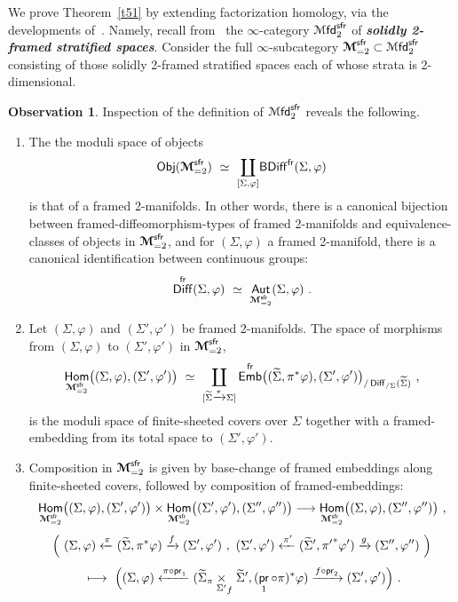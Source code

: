 \documentclass{amsart}
\theoremstyle{definition}
\newtheorem{observation}[theorem]{Observation}
\theoremstyle{remark}
\DeclareMathOperator{\pr}{\mathsf{pr}}
\DeclareMathOperator{\Aut}{\sf Aut}
\DeclareMathOperator{\Hom}{\sf Hom}
\newcommand{\bit}[1]{\textbf{\textit{#1}}}
\DeclareMathOperator{\Diff}{{\sf Diff}}
\DeclareMathOperator{\Mfd}{{\cM}\mathsf{fd}}
\DeclareMathOperator{\Emb}{\mathsf{Emb}}
\DeclareMathOperator{\fr}{\sf fr}
\DeclareMathOperator{\sfr}{\sf sfr}
\newcommand{\w}{\widetilde}
\newcommand{\xra}{\xrightarrow}
\newcommand{\xla}{\xleftarrow}
\def\cM{\mathcal M}\def\cN{\mathcal N}\def\cO{\mathcal O}\def\cP{\mathcal P}
\def\bcM{\boldsymbol{\mathcal M}}\def\bcN{\boldsymbol{\mathcal N}}\def\bcO{\boldsymbol{\mathcal O}}\def\bcP{\boldsymbol{\mathcal P}}\def\bcQ{\boldsymbol{\mathcal Q}}\def\bcR{\boldsymbol{\mathcal R}}
\def\bcM{\boldsymbol{\mathcal M}}
\DeclareMathOperator{\Obj}{\sf Obj}
\begin{document}
We prove Theorem~\ref{t51} by extending factorization homology, via the developments of~\cite{afr2}.
Namely, recall from~\cite{afr2} the $\infty$-category $\Mfd_2^{\sfr}$ of \bit{solidly 2-framed stratified spaces}.  
Consider the full $\infty$-subcategory $\bcM_{=2}^{\sfr}\subset \Mfd_2^{\sfr}$ consisting of those solidly 2-framed stratified spaces each of whose strata is 2-dimensional.
\begin{observation}
\label{t56}
Inspection of the definition of $\Mfd_2^{\sfr}$ reveals the following.
\begin{enumerate}

\item
The the moduli space of objects 
\[
\Obj( \bcM_{=2}^{\sfr})
~\simeq~
\underset{[\Sigma,\varphi]} \coprod {\sf BDiff}^{\fr}(\Sigma,\varphi)
\]
is that of a framed 2-manifolds.  
In other words, there is a canonical bijection between framed-diffeomorphism-types of framed 2-manifolds and equivalence-classes of objects in $\bcM_{=2}^{\sfr}$, and for $(\Sigma,\varphi)$ a framed 2-manifold, there is a canonical identification between continuous groups:
\[
\Diff^{\fr}(\Sigma,\varphi)
~\simeq~
\Aut_{\bcM_{=2}^{\sfr}}(\Sigma,\varphi)
~.
\]

\item
Let $(\Sigma,\varphi)$ and $(\Sigma',\varphi')$ be framed 2-manifolds.
The space of morphisms from $(\Sigma,\varphi)$ to $(\Sigma',\varphi')$ in $\bcM_{=2}^{\sfr}$,
\[
\Hom_{\bcM_{=2}^{\sfr}}\bigl( (\Sigma,\varphi) , (\Sigma',\varphi') \bigr)
~\simeq~
\underset{[\w{\Sigma}\xra{\pi}\Sigma]} \coprod \Emb^{\fr}\bigl( (\w{\Sigma},\pi^\ast \varphi) , (\Sigma',\varphi') \bigr)_{/\Diff_{/\Sigma}(\w{\Sigma})}
~,
\]
is the moduli space of finite-sheeted covers over $\Sigma$ together with a framed-embedding from its total space to $(\Sigma',\varphi')$.

\item
Composition in $\bcM_{=2}^{\sfr}$ is given by base-change of framed embeddings along finite-sheeted covers, followed by composition of framed-embeddings:
\[
\Hom_{\bcM_{=2}^{\sfr}}\bigl( (\Sigma,\varphi) , (\Sigma',\varphi') \bigr)
\times
\Hom_{\bcM_{=2}^{\sfr}}\bigl( (\Sigma',\varphi') , (\Sigma'',\varphi'') \bigr)
\longrightarrow
\Hom_{\bcM_{=2}^{\sfr}}\bigl( (\Sigma,\varphi) , (\Sigma'',\varphi'') \bigr)
~,
\]
\[
\Bigl(
~
(\Sigma,\varphi) \xla{\pi} (\w{\Sigma},\pi^\ast \varphi) \xra{f} (\Sigma',\varphi')
~,~
(\Sigma',\varphi') \xla{\pi'} (\w{\Sigma}',{\pi'}^\ast \varphi') \xra{g} (\Sigma'',\varphi'')
~
\Bigr)
\]
\[
~\longmapsto~
\Bigl(
(\Sigma,\varphi) \xla{\pi \circ \pr_1} (\w{\Sigma} _{\pi}\underset{\Sigma'} \times_f \w{\Sigma}',(\pr_1\circ \pi)^\ast \varphi) \xra{f \circ \pr_2} (\Sigma',\varphi')
\Bigr)
~.
\]



\end{enumerate}
\end{observation}
\end{document}
